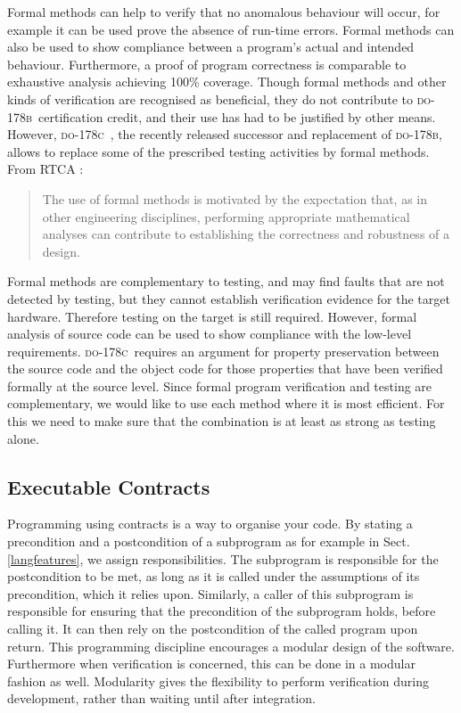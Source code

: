 \documentclass[sttt,draft]{svjour}
\newcommand{\DOB}{\textsc{do-178b}}
\newcommand{\DOC}{\textsc{do-178c}}
\begin{document}
Formal methods can help to verify that no anomalous behaviour will
occur, for example it can be used prove the absence of run-time
errors. Formal methods can also be used to show compliance between a
program's actual and intended behaviour. Furthermore, a proof of
program correctness is comparable to exhaustive analysis achieving
100\% coverage. Though formal methods and other kinds of verification
are recognised as beneficial, they do not contribute to \DOB\
certification credit, and their use has had to be justified by other
means. However, \DOC\ \cite{do178c}, the recently released successor and
replacement of \DOB, allows to replace some of the prescribed testing
activities by formal methods. From RTCA \cite{do178c}:
%
\begin{quote}
  The use of formal methods is motivated by the expectation that, as
  in other engineering disciplines, performing appropriate
  mathematical analyses can contribute to establishing the correctness
  and robustness of a design.
\end{quote}
%
Formal methods are complementary to testing, and may find faults that
are not detected by testing, but they cannot establish verification
evidence for the target hardware. Therefore testing on the target is
still required. However, formal analysis of source code can be used to
show compliance with the low-level requirements. \DOC\ requires an
argument for property preservation between the source code and the
object code for those properties that have been verified formally at
the source level. Since formal program verification and testing are
complementary, we would like to use each method where it is most
efficient. For this we need to make sure that the combination is at
least as strong as testing alone.

\subsection{Executable Contracts}
Programming using contracts is a way to organise your code. By stating
a precondition and a postcondition of a subprogram as for example in
Sect. \ref{langfeatures}, we assign responsibilities. The subprogram
is responsible for the postcondition to be met, as long as it is
called under the assumptions of its precondition, which it relies
upon. Similarly, a caller of this subprogram is responsible for ensuring that
the precondition of the subprogram holds, before calling it. It can
then rely on the postcondition of the called program upon return. This
programming discipline encourages a modular design of the
software. Furthermore when verification is concerned, this can be done
in a modular fashion as well. Modularity gives the flexibility to
perform verification during development, rather than waiting until
after integration.
\end{document}
